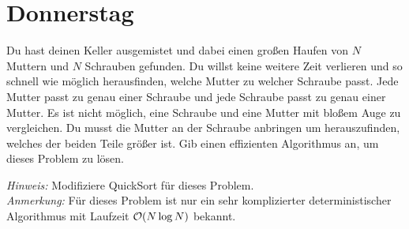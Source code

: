 \documentclass{uebung_cs}
\begin{document}
\section*{Donnerstag}

\begin{aufgabe}
	Du hast deinen Keller ausgemistet und dabei einen großen Haufen von $N$ Muttern und $N$ Schrauben gefunden. Du willst keine weitere Zeit verlieren und so schnell wie möglich herausfinden, welche Mutter zu welcher Schraube passt. Jede Mutter passt zu genau einer Schraube und jede Schraube passt zu genau einer Mutter. Es ist nicht möglich, eine Schraube und eine Mutter mit bloßem Auge zu vergleichen. Du musst die Mutter an der Schraube anbringen um herauszufinden, welches der beiden Teile größer ist. Gib einen effizienten Algorithmus an, um dieses Problem zu lösen.
	
	\textit{Hinweis:} Modifiziere QuickSort für dieses Problem.\\
	\textit{Anmerkung:} Für dieses Problem ist nur ein sehr komplizierter deterministischer Algorithmus mit Laufzeit $\mathcal{O}(N \log N)$ bekannt. 
\end{aufgabe}
\end{document}
